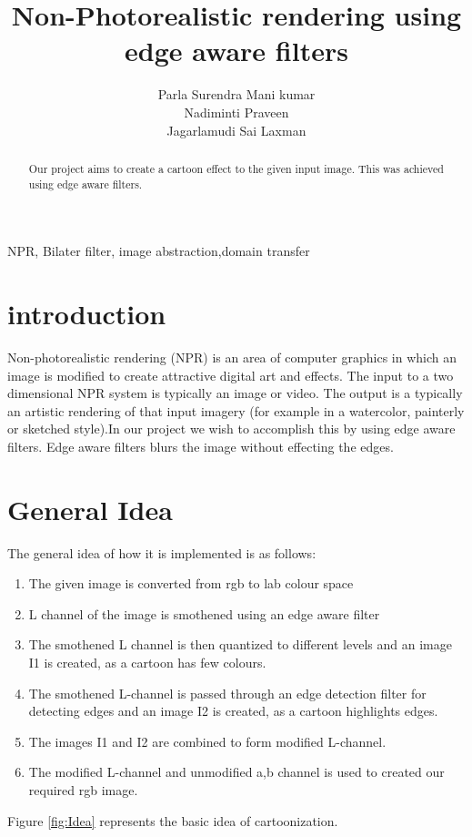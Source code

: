 \documentclass[conference]{IEEEtran}
\begin{document}
\title{Non-Photorealistic rendering using edge aware filters}
\author{Parla Surendra Mani kumar\\Nadiminti Praveen \\ Jagarlamudi Sai Laxman}
\maketitle

\begin{abstract}
	Our project aims to create a cartoon effect to the given input image. This was achieved using edge aware filters.	
\end{abstract}

\begin{IEEEkeywords}
	NPR, Bilater filter, image abstraction,domain transfer
\end{IEEEkeywords}

\section{introduction} \label{s1}
 Non-photorealistic rendering (NPR) is an area of computer graphics in which an image is modified to create attractive digital art and effects. The input to a two dimensional NPR system is typically an image or video. The output is a typically an artistic rendering of that input imagery (for example in a watercolor, painterly or sketched style).In our project we wish to accomplish this by using edge aware filters. Edge aware filters blurs the image without effecting the edges. 
  
 \section{General Idea}
 The general idea of how it is implemented is as follows:
 \begin{enumerate}
 \item The given image is converted from rgb to lab colour space
 \item L channel of the image is smothened using an edge aware filter
 \item The smothened L channel is then quantized to different levels and an image I1 is created, as a cartoon has few colours.
 \item The smothened L-channel is passed through an edge detection filter for detecting edges and an image I2 is created, as a cartoon highlights edges.
 \item The images I1 and I2 are combined to form modified L-channel.
 \item The modified L-channel and unmodified a,b channel is used to created our required rgb image.
 \end{enumerate}
  Figure \ref{fig:Idea} represents the basic idea of cartoonization.
  
\end{document}
